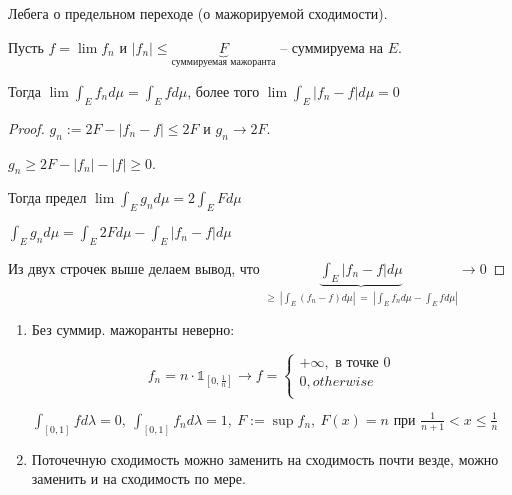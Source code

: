 \begin{theorem}
    Лебега о предельном переходе (о мажорируемой сходимости).

    Пусть $f = \lim{f_n}$ и $|f_n| \leq \underbrace{F}_{\text{суммируемая мажоранта}}$ -- суммируема на $E$.

    Тогда $\lim{\int_E{f_n d \mu}} = \int_E{f d \mu}$, более того $\lim{\int_E{|f_n - f|d \mu}} = 0$
\end{theorem}
\begin{proof}
    $g_n := 2F - |f_n - f| \leq 2F$ и $g_n \rightarrow 2F$.
    
    $g_n \geq 2F - |f_n| - |f| \geq 0$.

    Тогда предел $\lim{\int_E{g_n d \mu}} = 2 \int_E{F d \mu}$

    $\int_E{g_n d \mu} = \int_E{2 F d \mu} - \int_E{|f_n - f| d \mu}$

    Из двух строчек выше делаем вывод, что $\underbrace{\int_E{|f_n - f| d \mu}}_{\geq \ \left| \int_E{(f_n - f) d \mu} \right| \ = \ \left| \int_E{f_n d \mu} - \int_E{f d \mu} \right|} \rightarrow 0$
\end{proof}
\begin{remark}
    \begin{enumerate}
        \item {
            Без суммир. мажоранты неверно:

            \begin{equation}
                f_n = n \cdot \mathbb{1}_{[0, \frac{1}{n}]} \rightarrow f =
                \begin{cases}
                    +\infty, \text{  в точке 0} \\
                    0, otherwise \\
                \end{cases}
            \end{equation}
            

            $\int_{[0, 1]}{f d \lambda} = 0, \ \int_{[0, 1]}{f_n d \lambda} = 1, \ F:=\sup{f_n}, \ F(x) = n \text{ при } \frac{1}{n+1} < x \leq \frac{1}{n}$
        }
        \item {
            Поточечную сходимость можно заменить на сходимость почти везде, можно заменить и на сходимость по мере.
        }
    \end{enumerate}
\end{remark}

